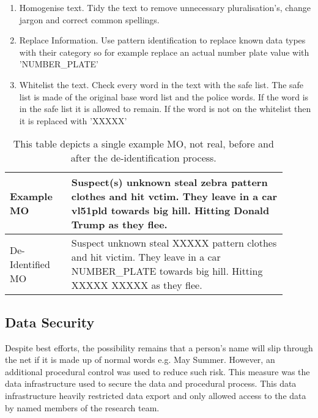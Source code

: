 \begin{enumerate}
    \item Homogenise text. Tidy the text to remove unnecessary pluralisation's, change jargon and correct common spellings.
    \item Replace Information. Use pattern identification to replace known data types with their category so for example replace an actual number plate value with 'NUMBER\_PLATE'
    \item Whitelist the text. Check every word in the text with the safe list. The safe list is made of the original base word list and the police words. If the word is in the safe list it is allowed to remain. If the word is not on the whitelist then it is replaced with 'XXXXX'
\end{enumerate}

\begin{table}[]
\centering
\begin{tabular}{p{0.2\linewidth}|p{0.7\linewidth}}
\toprule
Example MO       & Suspect(s) unknown steal zebra pattern clothes and hit vctim. They leave in a car vl51pld towards big hill. Hitting Donald Trump as they flee. \\ \midrule
De-Identified MO & Suspect unknown steal XXXXX pattern clothes and hit victim. They leave in a car NUMBER\_PLATE towards big hill. Hitting XXXXX XXXXX as they flee.    \\ \bottomrule
\end{tabular}
\caption[Example MO de-identification process]{\label{Example_deident} This table depicts a single example MO, not real, before and after the de-identification process.}
\end{table}


\subsection{Data Security} Despite best efforts, the possibility remains that a person’s name will slip through the net if it is made up of normal words e.g. May Summer. However, an additional procedural control was used to reduce such risk. This measure was the data infrastructure used to secure the data and procedural process. This data infrastructure heavily restricted data export and only allowed access to the data by named members of the research team. 

